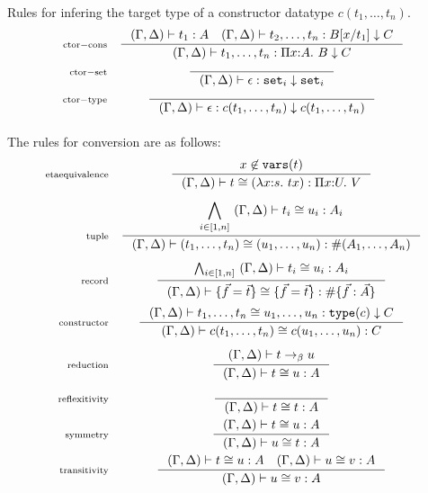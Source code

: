 \documentclass{article}
\newcommand{\fn}[1]{\mathtt{#1}}
\newcommand{\set}[1]{\fn{set}_{#1}}
\newcommand{\rctor}[4]{#1 |- {#2} : {#3} \downarrow {#4}}
\newcommand{\lamexpr}[3]{\lambda {#1}{:}{#2}.\ {#3}}
\newcommand{\Piexpr}[3]{\Pi {#1}{:}{#2}.\ {#3}}
\newcommand{\rlbl}[1]{\mathrm{\scriptstyle{}#1}}
\begin{document}
Rules for infering the target type of a constructor datatype $c(t_1, \dots, t_n)$.
\begin{gather*}
\begin{array}{rc}
\rlbl{ctor-cons}&
\inference{\defctx{}|- t_1 : A
     \quad \rctor{\defctx}{t_2,\dots,t_n}{B[x/t_1]}{C}}
          {\rctor{\defctx}{t_1,\dots,t_n}{\Piexpr{x}{A}{B}}{C}}\\[1em]
\rlbl{ctor-set}&
\inference{}
          {\rctor{\defctx}{\epsilon}{\set{i}}{\set{i}}}\\[1em]
\rlbl{ctor-type}&
\inference{}
          {\rctor{\defctx}{\epsilon}{c(t_1, \dots, t_n)}{c(t_1, \dots, t_n)}}\\[1em]
\end{array}
\end{gather*}

\newcommand{\red}{\to_\beta}


\newcommand{\tcong}[4]{#1 |- #2 \cong #3 : #4}
\newcommand{\ccong}[5]{\tcong{#1}{#2}{#3}{#4} \downarrow #5}


The rules for conversion are as follows:
\begin{gather*}
\begin{array}{rc}
\rlbl{eta equivalence}&
\inference{x \not\in \fn{vars}(t)}
          {\tcong{\defctx}{t}{(\lamexpr{x}{s}{t x})}{\Piexpr{x}{U}{V}}}\\[1.5em]
\rlbl{tuple}&
\inference{\displaystyle
           \bigwedge_{i\in[1,n]}\ \tcong{\defctx}{t_i}{u_i}{A_i}}
          {\tcong{\defctx}{  (t_1, \dots, t_n)}
                          {  (u_1, \dots, u_n)}
                          {\#(A_1, \dots, A_n)}}\\[1.5em]
\rlbl{record}&
\inference{\bigwedge_{i\in[1,n]}\ \tcong{\defctx}{t_i}{u_i}{A_i}}
          {\tcong{\defctx}{  \{ \vec{f} = \vec{t} \} }
                          {  \{ \vec{f} = \vec{t} \} }
                          {\#\{ \vec{f} : \vec{A} \} }}\\[1.5em]
\rlbl{constructor}&
\inference{\ccong{\defctx}{t_1,\dots,t_n}{u_1,\dots,u_n}{\fn{type}(c)}{C}}
          {\tcong{\defctx}{c(t_1, \dots, t_n)}{c(u_1, \dots, u_n)}{C}}\\[1.5em]
\rlbl{reduction}&
\inference{\defctx |- t \red{} u}
          {\tcong{\defctx}{t}{u}{A}}\\[1.5em]
\rlbl{reflexitivity}&
\inference{}{\tcong{\defctx}{t}{t}{A}}\\[1em]
\rlbl{symmetry}&
\inference{\tcong{\defctx}{t}{u}{A}}{\tcong{\defctx}{u}{t}{A}}\\[1em]
\rlbl{transitivity}&
\inference{\tcong{\defctx}{t}{u}{A}
     \quad \tcong{\defctx}{u}{v}{A}}
          {\tcong{\defctx}{u}{v}{A}}\\[1em]
\end{array}
\end{gather*}
\end{document}
